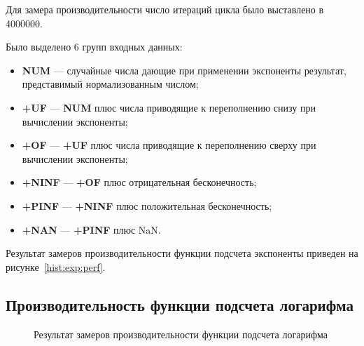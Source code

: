 Для замера производительности число итераций цикла было выставлено в 4000000.

Было выделено 6 групп входных данных:

\begin{itemize}
    \item \textbf{NUM} --- случайные числа дающие при применении экспоненты результат, представимый нормализованным числом;
    \item \textbf{+UF} --- \textbf{NUM} плюс числа приводящие к переполнению снизу при вычислении экспоненты;
    \item \textbf{+OF} --- \textbf{+UF} плюс числа приводящие к переполнению сверху при вычислении экспоненты;
    \item \textbf{+NINF} --- \textbf{+OF} плюс отрицательная бесконечность;
    \item \textbf{+PINF} --- \textbf{+NINF} плюс положительная бесконечность;
    \item \textbf{+NAN} --- \textbf{+PINF} плюс NaN.
\end{itemize}

Результат замеров производительности функции подсчета экспоненты приведен на рисунке~\ref{hist:exp:perf}.


\subsection{Производительность функции подсчета логарифма}

\begin{figure}[h]
  \centering
  \caption{Результат замеров производительности функции подсчета логарифма}
  \label{hist:log:perf}
\end{figure}

